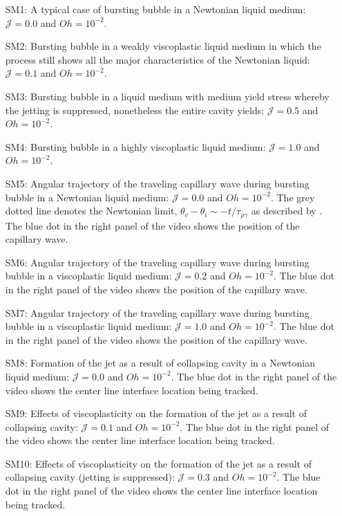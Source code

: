\begin{subappendices}
\begin{enumerate}
	\item[SM1:] A typical case of bursting bubble in a Newtonian liquid medium: $\mathcal{J} = 0.0$ and $Oh = 10^{-2}$. 
	\item[SM2:] Bursting bubble in a weakly viscoplastic liquid medium in which the process still shows all the major characteristics of the Newtonian liquid: $\mathcal{J} = 0.1$ and $Oh = 10^{-2}$. 
	\item[SM3:] Bursting bubble in a liquid medium with medium yield stress whereby the jetting is suppressed, nonetheless the entire cavity yields: $\mathcal{J} = 0.5$ and $Oh = 10^{-2}$.
	\item[SM4:] Bursting bubble in a highly viscoplastic liquid medium: $\mathcal{J} = 1.0$ and $Oh = 10^{-2}$.
	\item[SM5:] Angular trajectory of the traveling capillary wave during bursting bubble in a Newtonian liquid medium: $\mathcal{J} = 0.0$ and $Oh = 10^{-2}$. The grey dotted line denotes the Newtonian limit, $\theta_c - \theta_i \sim -t/\tau_{\rho\gamma}$ as described by \citet{gordillo2019capillary}. The blue dot in the right panel of the video shows the position of the capillary wave.
	\item[SM6:] Angular trajectory of the traveling capillary wave during bursting bubble in a viscoplastic liquid medium: $\mathcal{J} = 0.2$ and $Oh = 10^{-2}$. The blue dot in the right panel of the video shows the position of the capillary wave.
	\item[SM7:] Angular trajectory of the traveling capillary wave during bursting bubble in a viscoplastic liquid medium: $\mathcal{J} = 1.0$ and $Oh = 10^{-2}$. The blue dot in the right panel of the video shows the position of the capillary wave. 
	\item[SM8:] Formation of the jet as a result of collapsing cavity in a Newtonian liquid medium: $\mathcal{J} = 0.0$ and $Oh = 10^{-2}$. The blue dot in the right panel of the video shows the center line interface location being tracked.
	\item[SM9:] Effects of viscoplasticity on the formation of the jet as a result of collapsing cavity: $\mathcal{J} = 0.1$ and $Oh = 10^{-2}$. The blue dot in the right panel of the video shows the center line interface location being tracked. 
	\item[SM10:] Effects of viscoplasticity on the formation of the jet as a result of collapsing cavity (jetting is suppressed): $\mathcal{J} = 0.3$ and $Oh = 10^{-2}$. The blue dot in the right panel of the video shows the center line interface location being tracked.

\end{enumerate}
\end{subappendices}
